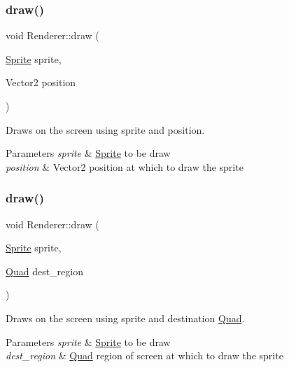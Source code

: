 \subsubsection{\texorpdfstring{draw()}{draw()}\hspace{0.1cm}{\footnotesize\ttfamily [1/3]}}
{\footnotesize\ttfamily void Renderer\+::draw (\begin{DoxyParamCaption}\item[{\mbox{\hyperlink{classinferno_1_1graphics_1_1_sprite}{Sprite}}}]{sprite,  }\item[{Vector2}]{position }\end{DoxyParamCaption})}



Draws on the screen using sprite and position. 


\begin{DoxyParams}{Parameters}
{\em sprite} & \mbox{\hyperlink{classinferno_1_1graphics_1_1_sprite}{Sprite}} to be draw \\
\hline
{\em position} & Vector2 position at which to draw the sprite \\
\hline
\end{DoxyParams}
\mbox{\label{classinferno_1_1graphics_1_1_renderer_a0fece22ee034838860dbfc4e11281895}} 
\subsubsection{\texorpdfstring{draw()}{draw()}\hspace{0.1cm}{\footnotesize\ttfamily [2/3]}}
{\footnotesize\ttfamily void Renderer\+::draw (\begin{DoxyParamCaption}\item[{\mbox{\hyperlink{classinferno_1_1graphics_1_1_sprite}{Sprite}}}]{sprite,  }\item[{\mbox{\hyperlink{classinferno_1_1graphics_1_1_quad}{Quad}}}]{dest\+\_\+region }\end{DoxyParamCaption})}



Draws on the screen using sprite and destination \mbox{\hyperlink{classinferno_1_1graphics_1_1_quad}{Quad}}. 


\begin{DoxyParams}{Parameters}
{\em sprite} & \mbox{\hyperlink{classinferno_1_1graphics_1_1_sprite}{Sprite}} to be draw \\
\hline
{\em dest\+\_\+region} & \mbox{\hyperlink{classinferno_1_1graphics_1_1_quad}{Quad}} region of screen at which to draw the sprite \\
\hline
\end{DoxyParams}
\mbox{\label{classinferno_1_1graphics_1_1_renderer_a5f72164c93ad346bce319c61fdecaab8}} 
